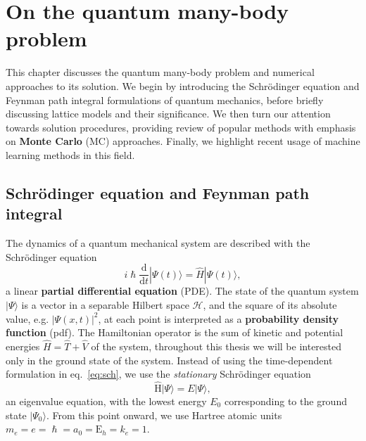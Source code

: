 
\chapter{On the quantum many-body problem}
\label{chapter2}
This chapter discusses the quantum many-body problem and numerical approaches to its solution. We begin by introducing the Schr\" odinger equation and Feynman path integral formulations of quantum mechanics, before briefly discussing lattice models and their significance. We then turn our attention towards solution procedures, providing review of popular methods with emphasis on \textbf{Monte Carlo} (MC) approaches. Finally, we highlight recent usage of machine learning methods in this field.

\ifpdf
    \graphicspath{{Chapter2/Figs/Raster/}{Chapter2/Figs/PDF/}{Chapter2/Figs/}}
\else
    \graphicspath{{Chapter2/Figs/Vector/}{Chapter2/Figs/}}
\fi

\section{Schr{\"o}dinger equation and Feynman path integral}
\label{subsec:latt-qm}
The dynamics of a quantum mechanical system are described with the Schr\" odinger equation
\begin{equation}
\label{eq:sch}
i \hslash \frac{\mathrm{d}}{\mathrm{d} t}|\Psi(t)\rangle=\hat{H}|\Psi(t)\rangle,
\end{equation}
a linear \textbf{partial differential equation} (PDE). The state of the quantum system $| \Psi \rangle$ is a vector in a separable Hilbert space $\mathcal{H}$, and the square of its absolute value, e.g. $|\Psi(x, t)|^2$, at each point is interpreted as a \textbf{probability density function} (pdf). The Hamiltonian operator is the sum of kinetic and potential energies $\hat H = \hat T + \hat V$ of the system,  throughout this thesis we will be interested only in the ground state of the system. Instead of using the time-dependent formulation in eq.~\eqref{eq:sch}, we use the \emph{stationary} Schr\" odinger equation
\begin{equation}
\hat{\mathrm{H}}|\Psi\rangle=E|\Psi\rangle,
\end{equation}
an eigenvalue equation, with the lowest energy $E_0$ corresponding to the ground state $|\Psi_{0}\rangle$. From this point onward, we use Hartree atomic units $m_{e}=e=\hslash=a_{0}=\mathrm{E}_{h}=k_{e}=1$.

